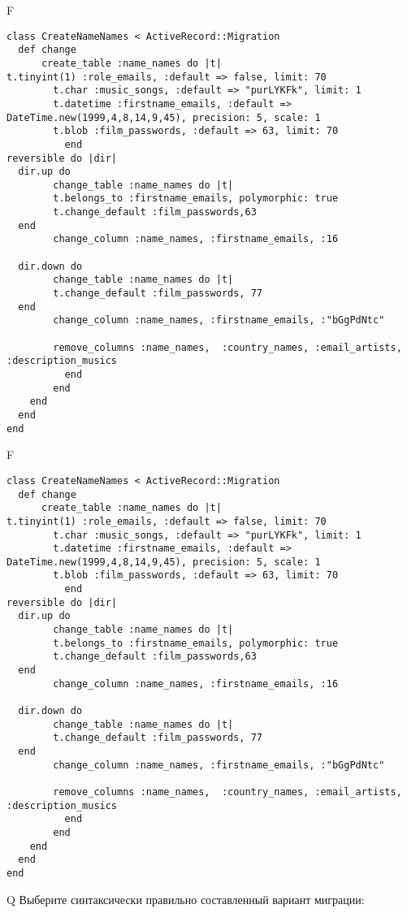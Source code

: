 F
\begin{verbatim}
class CreateNameNames < ActiveRecord::Migration
  def change
	  create_table :name_names do |t|
t.tinyint(1) :role_emails, :default => false, limit: 70
		t.char :music_songs, :default => "purLYKFk", limit: 1
		t.datetime :firstname_emails, :default => DateTime.new(1999,4,8,14,9,45), precision: 5, scale: 1
		t.blob :film_passwords, :default => 63, limit: 70
		  end
reversible do |dir|
  dir.up do
		change_table :name_names do |t|
		t.belongs_to :firstname_emails, polymorphic: true
 		t.change_default :film_passwords,63
  end
 		change_column :name_names, :firstname_emails, :16
   
  dir.down do
		change_table :name_names do |t|
		t.change_default :film_passwords, 77
  end
 		change_column :name_names, :firstname_emails, :"bGgPdNtc"
   
		remove_columns :name_names,  :country_names, :email_artists, :description_musics 
	      end
	    end
    end 
  end
end

\end{verbatim}

F
\begin{verbatim}
class CreateNameNames < ActiveRecord::Migration
  def change
	  create_table :name_names do |t|
t.tinyint(1) :role_emails, :default => false, limit: 70
		t.char :music_songs, :default => "purLYKFk", limit: 1
		t.datetime :firstname_emails, :default => DateTime.new(1999,4,8,14,9,45), precision: 5, scale: 1
		t.blob :film_passwords, :default => 63, limit: 70
		  end
reversible do |dir|
  dir.up do
		change_table :name_names do |t|
		t.belongs_to :firstname_emails, polymorphic: true
 		t.change_default :film_passwords,63
  end
 		change_column :name_names, :firstname_emails, :16
   
  dir.down do
		change_table :name_names do |t|
		t.change_default :film_passwords, 77
  end
 		change_column :name_names, :firstname_emails, :"bGgPdNtc"
   
		remove_columns :name_names,  :country_names, :email_artists, :description_musics 
	      end
	    end
    end 
  end
end

\end{verbatim}

Q
Выберите синтаксически правильно составленный вариант миграции:

